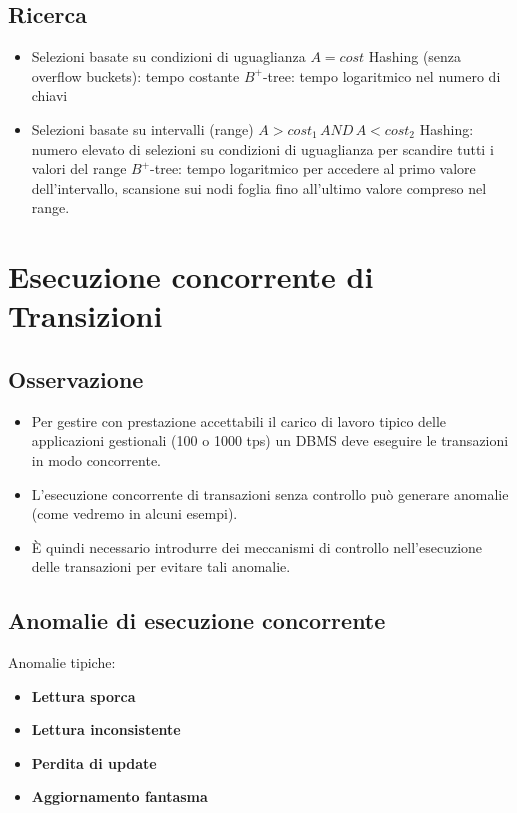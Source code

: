 \documentclass[a4paper, 10pt]{article}
\theoremstyle{definition}
\begin{document}
	\subsection*{Ricerca}
		\begin{itemize}
			\item Selezioni basate su condizioni di uguaglianza $ A = cost $
				\subitem Hashing (senza overflow buckets): tempo costante
				\subitem $ B^+$-tree: tempo logaritmico nel numero di chiavi
			\item Selezioni basate su intervalli (range) $ A > cost_1 \, AND \, A < cost_2 $
				\subitem Hashing: numero elevato di selezioni su condizioni di
				uguaglianza per scandire tutti i valori del range
				\subitem $ B^+$-tree: tempo logaritmico per accedere al primo valore
				dell'intervallo, scansione sui nodi foglia fino all'ultimo valore
				compreso nel range.
		\end{itemize}
		
		
\section{Esecuzione concorrente di Transizioni}
	\subsection*{Osservazione}
		\begin{itemize}
			\item Per gestire con prestazione accettabili il carico di
			lavoro tipico delle applicazioni gestionali (100 o
			1000 tps) un DBMS deve eseguire le transazioni in
			modo concorrente.
			\item  L'esecuzione concorrente di transazioni senza
			controllo può generare anomalie (come vedremo in
			alcuni esempi).
			\item È quindi necessario introdurre dei meccanismi di
			controllo nell'esecuzione delle transazioni per
			evitare tali anomalie.
		\end{itemize}
		
	\subsection{Anomalie di esecuzione concorrente}
		Anomalie tipiche:
		\begin{itemize}
			\item \textbf{Lettura sporca}
			\item \textbf{Lettura inconsistente}
			\item \textbf{Perdita di update}
			\item \textbf{Aggiornamento fantasma}
		\end{itemize}
\end{document}
